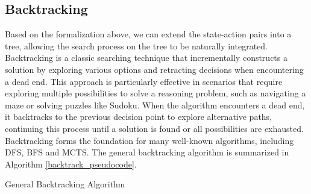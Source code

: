 \documentclass{article}
\theoremstyle{plain}
\theoremstyle{definition}
\theoremstyle{remark}
\begin{document}
\subsection{Backtracking}
Based on the formalization above, we can extend the state-action pairs into a tree, allowing the search process on the tree to be naturally integrated. Backtracking is a classic searching technique that incrementally constructs a solution by exploring various options and retracting decisions when encountering a dead end. This approach is particularly effective in scenarios that require exploring multiple possibilities to solve a reasoning problem, such as navigating a maze or solving puzzles like Sudoku. When the algorithm encounters a dead end, it backtracks to the previous decision point to explore alternative paths, continuing this process until a solution is found or all possibilities are exhausted. Backtracking forms the foundation for many well-known algorithms, including DFS, BFS and MCTS. The general backtracking algorithm is summarized in Algorithm \ref{backtrack_pseudocode}.

\begin{algorithm}[t]
\caption{General Backtracking Algorithm}
\label{backtrack_pseudocode}
\end{algorithm}
\end{document}
